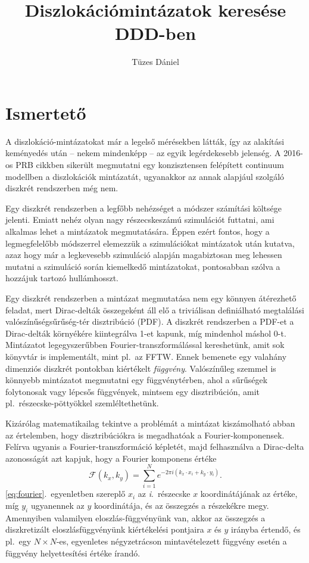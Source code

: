 \documentclass[10pt,a4paper]{scrartcl}
\title{Diszlokációmintázatok keresése DDD-ben}
\author{Tüzes Dániel}
\begin{document}
\maketitle
\tableofcontents

\section{Ismertető}
A diszlokáció-mintázatokat már a legelső mérésekben látták, így az alakítási keményedés után -- nekem mindenképp -- az egyik legérdekesebb jelenség. A 2016-os PRB cikkben sikerült megmutatni egy konzisztensen felépített continuum modellben a diszlokációk mintázatát, ugyanakkor az annak alapjául szolgáló diszkrét rendszerben még nem.

Egy diszkrét rendszerben a legfőbb nehézséget a módszer számítási költsége jelenti. Emiatt nehéz olyan nagy részecskeszámú szimulációt futtatni, ami alkalmas lehet a mintázatok megmutatására. Éppen ezért fontos, hogy a legmegfelelőbb módszerrel elemezzük a szimulációkat mintázatok után kutatva, azaz hogy már a legkevesebb szimuláció alapján magabiztosan meg lehessen mutatni a szimuláció során kiemelkedő mintázatokat, pontosabban szólva a hozzájuk tartozó hullámhosszt.

Egy diszkrét rendszerben a mintázat megmutatása nem egy könnyen átérezhető feladat, mert Dirac-delták összegeként áll elő a triviálisan definiálható megtalálási valószínűségsűrűség-tér disztribúció (PDF). A diszkrét rendszerben a PDF-et a Dirac-delták környékére kiintegrálva 1-et kapunk, míg mindenhol máshol 0-t. Mintázatot legegyszerűbben Fourier-transzformálással kereshetünk, amit sok könyvtár is implementált, mint pl.\ az FFTW. Ennek bemenete egy valahány dimenziós diszkrét pontokban kiértékelt \textit{függvény}. Valószínűleg szemmel is könnyebb mintázatot megmutatni egy függvénytérben, ahol a sűrűségek folytonosak vagy lépcsős függvények, mintsem egy disztribúción, amit pl.\ részecske-pöttyökkel szemléltethetünk.

Kizárólag matematikailag tekintve a problémát a mintázat kiszámolható abban az értelemben, hogy disztribúciókra is megadhatóak a Fourier-komponensek. Felírva ugyanis a Fourier-transzformáció képletét, majd felhasználva a Dirac-delta azonosságát azt kapjuk, hogy a Fourier komponens értéke
\begin{equation} \label{eq:fourier}
\mathcal{F}\left( {{k_x},{k_y}} \right) = \sum\limits_{i = 1}^N {{e^{ - 2\pi i\left( {{k_x} \cdot {x_i} + {k_y} \cdot {y_i}} \right)}}}.
\end{equation}
\eqref{eq:fourier}.\ egyenletben szereplő $x_i$ az \textit{i}.\ részecske $x$ koordinátájának az értéke, míg $y_i$ ugyanennek az $y$ koordinátája, és az összegzés a részekékre megy. Amennyiben valamilyen eloszlás-függvényünk van, akkor az összegzés a diszkretizált eloszlásfüggvényünk kiértékelési pontjaira $x$ és $y$ irányba értendő, és pl.\ egy $N\times N$-es, egyenletes négyzetrácson mintavételezett függvény esetén a függvény helyettesítési értéke írandó.
\end{document}
